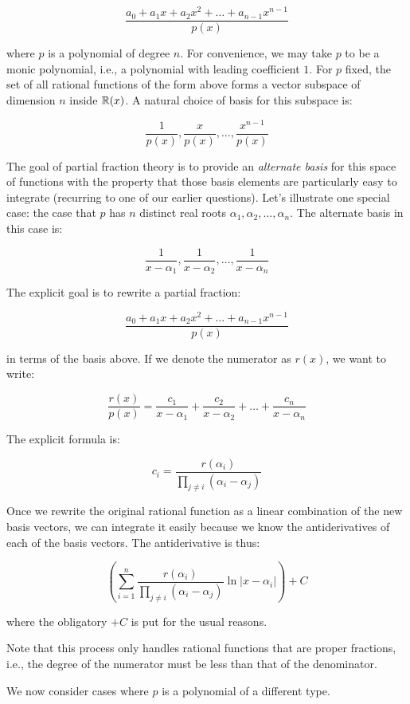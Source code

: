 \documentclass[10pt]{amsart}
\begin{document}
\begin{enumerate}
  $$\frac{a_0 + a_1x + a_2x^2 + \dots + a_{n-1}x^{n-1}}{p(x)}$$

  where $p$ is a polynomial of degree $n$. For convenience, we may
  take $p$ to be a monic polynomial, i.e., a polynomial with leading
  coefficient $1$. For $p$ fixed, the set of all rational functions of
  the form above forms a vector subspace of dimension $n$ inside
  $\mathbb{R}(x)$. A natural choice of basis for this subspace is:

  $$\frac{1}{p(x)}, \frac{x}{p(x)}, \dots, \frac{x^{n-1}}{p(x)}$$

  The goal of partial fraction theory is to provide an {\em alternate
    basis} for this space of functions with the property that those
  basis elements are particularly easy to integrate (recurring to one
  of our earlier questions). Let's illustrate one special case: the
  case that $p$ has $n$ distinct real roots
  $\alpha_1,\alpha_2,\dots,\alpha_n$. The alternate basis in this case is:

  $$\frac{1}{x - \alpha_1}, \frac{1}{x - \alpha_2}, \dots, \frac{1}{x - \alpha_n}$$

  The explicit goal is to rewrite a partial fraction:

  $$\frac{a_0 + a_1x + a_2x^2 + \dots + a_{n-1}x^{n-1}}{p(x)}$$

  in terms of the basis above. If we denote the numerator as $r(x)$, we want to write:

  $$\frac{r(x)}{p(x)} = \frac{c_1}{x - \alpha_1} + \frac{c_2}{x - \alpha_2} + \dots + \frac{c_n}{x - \alpha_n}$$

  The explicit formula is:

  $$c_i = \frac{r(\alpha_i)}{\prod_{j \ne i} (\alpha_i - \alpha_j)}$$

  Once we rewrite the original rational function as a linear
  combination of the new basis vectors, we can integrate it easily
  because we know the antiderivatives of each of the basis
  vectors. The antiderivative is thus:

  $$\left(\sum_{i=1}^n \frac{r(\alpha_i)}{\prod_{j \ne i} (\alpha_i - \alpha_j)} \ln|x - \alpha_i|\right) + C$$

  where the obligatory $+C$ is put for the usual reasons.

  Note that this process only handles rational functions that are
  proper fractions, i.e., the degree of the numerator must be less
  than that of the denominator.

  We now consider cases where $p$ is a polynomial of a different type.


\end{enumerate}
\end{document}
